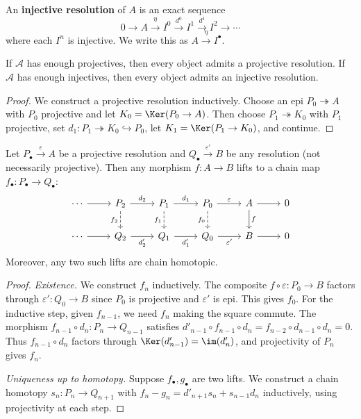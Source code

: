 \begin{definition}\label{def:inj-resolution}
An \textbf{injective resolution} of $A$ is an exact sequence
\[
    0 \longrightarrow A \xrightarrow{\eta} I^0 \xrightarrow{d^0} I^1
    \xrightarrow{d^1} I^2 \longrightarrow \cdots
\]
where each $I^n$ is injective. We write this as $A \xrightarrow{\eta} I^\bullet$.
\end{definition}

\begin{proposition}\label{prop:resolution-existence}
If $\mathcal{A}$ has enough projectives, then every object admits a projective resolution.
If $\mathcal{A}$ has enough injectives, then every object admits an injective resolution.
\end{proposition}

\begin{proof}
We construct a projective resolution inductively. Choose an epi $P_0 \twoheadrightarrow A$
with $P_0$ projective and let $K_0 = \Ker(P_0 \to A)$. Then choose $P_1 \twoheadrightarrow K_0$
with $P_1$ projective, set $d_1 \colon P_1 \twoheadrightarrow K_0 \hookrightarrow P_0$,
let $K_1 = \Ker(P_1 \to K_0)$, and continue.
\end{proof}

\begin{theorem}\label{thm:comparison}
Let $P_\bullet \xrightarrow{\varepsilon} A$ be a projective resolution and
$Q_\bullet \xrightarrow{\varepsilon'} B$ be any resolution (not necessarily projective).
Then any morphism $f \colon A \to B$ lifts to a chain map
$f_\bullet \colon P_\bullet \to Q_\bullet$:
\[
\begin{tikzcd}
    \cdots \arrow[r] & P_2 \arrow[r, "d_2"] \arrow[d, dashed, "f_2"'] & P_1 \arrow[r, "d_1"] \arrow[d, dashed, "f_1"'] & P_0 \arrow[r, "\varepsilon"] \arrow[d, dashed, "f_0"'] & A \arrow[r] \arrow[d, "f"] & 0 \\
    \cdots \arrow[r] & Q_2 \arrow[r, "d_2'"'] & Q_1 \arrow[r, "d_1'"'] & Q_0 \arrow[r, "\varepsilon'"'] & B \arrow[r] & 0
\end{tikzcd}
\]
Moreover, any two such lifts are chain homotopic.
\end{theorem}

\begin{proof}
\textit{Existence.} We construct $f_n$ inductively. The composite $f \circ \varepsilon \colon P_0 \to B$
factors through $\varepsilon' \colon Q_0 \to B$ since $P_0$ is projective and $\varepsilon'$
is epi. This gives $f_0$. For the inductive step, given $f_{n-1}$, we need $f_n$ making the
square commute. The morphism $f_{n-1} \circ d_n \colon P_n \to Q_{n-1}$ satisfies
$d'_{n-1} \circ f_{n-1} \circ d_n = f_{n-2} \circ d_{n-1} \circ d_n = 0$. Thus
$f_{n-1} \circ d_n$ factors through $\Ker(d'_{n-1}) = \im(d'_n)$, and projectivity of $P_n$
gives $f_n$.

\textit{Uniqueness up to homotopy.} Suppose $f_\bullet, g_\bullet$ are two lifts.
We construct a chain homotopy $s_n \colon P_n \to Q_{n+1}$ with
$f_n - g_n = d'_{n+1} s_n + s_{n-1} d_n$ inductively, using projectivity at each step.
\end{proof}


